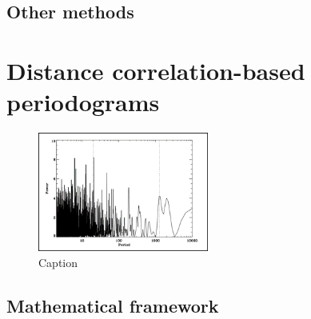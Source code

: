         \subsection{Other methods}

        
    \section{Distance correlation-based periodograms}

    
        \begin{figure}[H]
        \centering
        \includegraphics[width=0.5\textwidth]{report/images/chap2_foundations/carolo_2014.png}
        \caption{Caption}
        \label{2.5a}
        \end{figure}
        
        \subsection{Mathematical framework}

